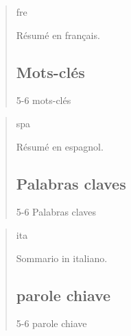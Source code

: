\documentclass[nomenclature, english, bibtex]{kththesis}
\begin{document}
\begin{abstract}
    \markboth{\abstractname}{}
\begin{scontents}[store-env=lang]
fre
\end{scontents}
\begin{scontents}[store-env=abstracts,print-env=true]
Résumé en français.
\end{scontents}
\subsection*{Mots-clés}
\begin{scontents}[store-env=keywords,print-env=true]
5-6 mots-clés
\end{scontents}
\end{abstract}
\cleardoublepage
{}
\begin{abstract}
    \markboth{\abstractname}{}
\begin{scontents}[store-env=lang]
spa
\end{scontents}
\begin{scontents}[store-env=abstracts,print-env=true]
Résumé en espagnol.
\end{scontents}
\subsection*{Palabras claves}
\begin{scontents}[store-env=keywords,print-env=true]
5-6 Palabras claves
\end{scontents}
\end{abstract}
\cleardoublepage
{}
\begin{abstract}
    \markboth{\abstractname}{}
\begin{scontents}[store-env=lang]
ita
\end{scontents}
\begin{scontents}[store-env=abstracts,print-env=true]
Sommario in italiano.
\end{scontents}
\subsection*{parole chiave}
\begin{scontents}[store-env=keywords,print-env=true]
5-6 parole chiave
\end{scontents}
\end{abstract}
\end{document}
